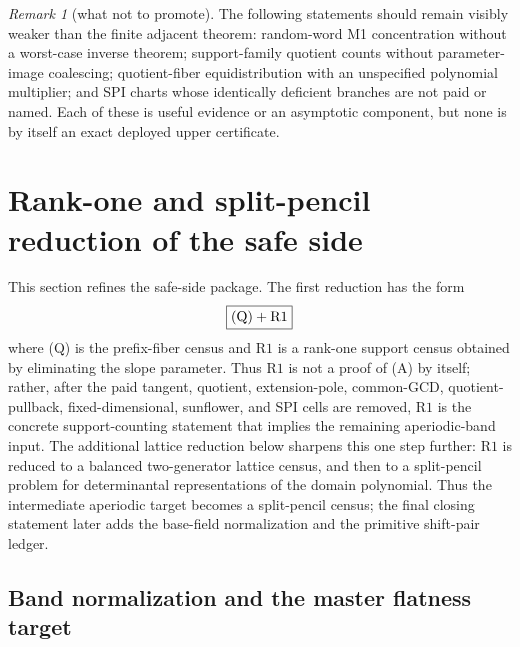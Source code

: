 \documentclass[11pt]{article}
\theoremstyle{definition}
\theoremstyle{remark}
\newtheorem{remark}[remark]{Remark}
\begin{document}
\begin{remark}[what not to promote]\label{rem:capfaq-not-to-promote}
The following statements should remain visibly weaker than the finite adjacent theorem: random-word M1 concentration without a worst-case inverse theorem; support-family quotient counts without parameter-image coalescing; quotient-fiber equidistribution with an unspecified polynomial multiplier; and SPI charts whose identically deficient branches are not paid or named.  Each of these is useful evidence or an asymptotic component, but none is by itself an exact deployed upper certificate.
\end{remark}

\providecommand{\Rone}{\mathrm{R1}}
\providecommand{\Ker}{\operatorname{Ker}}
\providecommand{\rank}{\operatorname{rank}}
\providecommand{\Mode}{\operatorname{Mode}}
\providecommand{\Fib}{\operatorname{Fib}}
\providecommand{\Aff}{\operatorname{Aff}}
\providecommand{\wt}{\operatorname{wt}}
\providecommand{\Cen}{\operatorname{cen}}
\providecommand{\wdeg}{\operatorname{wdeg}}

\section{Rank-one and split-pencil reduction of the safe side}\label{sec:capfr1-programme}

This section refines the safe-side package.  The first reduction has the form
\[
        \boxed{\textup{(Q)}+\Rone}
\]
where \textup{(Q)} is the prefix-fiber census and \(\Rone\) is a rank-one support census obtained by eliminating the slope parameter.  Thus \(\Rone\) is not a proof of \textup{(A)} by itself; rather, after the paid tangent, quotient, extension-pole, common-GCD, quotient-pullback, fixed-dimensional, sunflower, and SPI cells are removed, \(\Rone\) is the concrete support-counting statement that implies the remaining aperiodic-band input.  The additional lattice reduction below sharpens this one step further: \(\Rone\) is reduced to a balanced two-generator lattice census, and then to a split-pencil problem for determinantal representations of the domain polynomial.  Thus the intermediate aperiodic target becomes a split-pencil census; the final closing statement later adds the base-field normalization and the primitive shift-pair ledger.

\subsection{Band normalization and the master flatness target}\label{subsec:capfr1-band-flatness}
\end{document}
